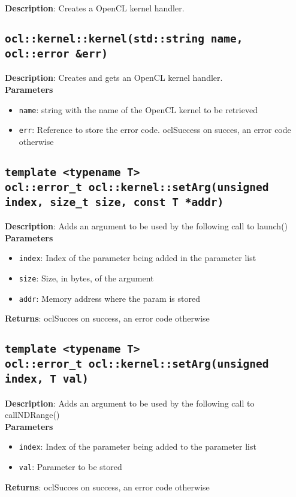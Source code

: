\textbf{Description}: Creates a OpenCL kernel handler.

\subsection{\texttt{ocl::kernel::kernel(std::string name, ocl::error &err)}}

\textbf{Description}: Creates and gets an OpenCL kernel handler. \\
\textbf{Parameters}
\begin{itemize}
  \item \texttt{name}: string with the name of the OpenCL kernel to be retrieved
  \item \texttt{err}: Reference to store the error code. oclSuccess on succes, an error code 
  otherwise
\end{itemize}

\subsection{\texttt{template <typename T>\\ocl::error\_t ocl::kernel::setArg(unsigned index, size\_t 
size, const T *addr)}}

\textbf{Description}: Adds an argument to be used by the following call to launch()\\
\textbf{Parameters}
\begin{itemize}
  \item \texttt{index}: Index of the parameter being added in the parameter list
  \item \texttt{size}: Size, in bytes, of the argument
  \item \texttt{addr}: Memory address where the param is stored
\end{itemize}
\textbf{Returns}: oclSucces on success, an error code otherwise

\subsection{\texttt{template <typename T>\\ocl::error\_t ocl::kernel::setArg(unsigned index, T 
val)}}

\textbf{Description}: Adds an argument to be used by the following call to callNDRange()\\
\textbf{Parameters}
\begin{itemize}
  \item \texttt{index}: Index of the parameter being added to the parameter list
  \item \texttt{val}: Parameter to be stored
\end{itemize}
\textbf{Returns}: oclSucces on success, an error code otherwise

